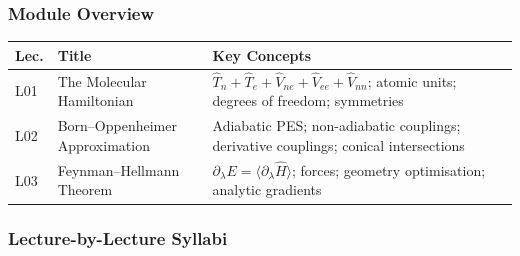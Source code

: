 \documentclass[11pt,a4paper]{article}
\begin{document}
\subsubsection*{Module Overview}
{\footnotesize
\begin{center}
\begin{tabular}{@{}lp{4.2cm}p{6.8cm}@{}}
\toprule
\textbf{Lec.} & \textbf{Title} & \textbf{Key Concepts}\\
\midrule
L01 & The Molecular Hamiltonian & $\hat{T}_n+\hat{T}_e+\hat{V}_{ne}+\hat{V}_{ee}+\hat{V}_{nn}$; atomic units; degrees of freedom; symmetries\\
L02 & Born--Oppenheimer Approximation & Adiabatic PES; non-adiabatic couplings; derivative couplings; conical intersections\\
L03 & Feynman--Hellmann Theorem & $\partial_\lambda E=\langle\partial_\lambda\hat{H}\rangle$; forces; geometry optimisation; analytic gradients\\
\bottomrule
\end{tabular}
\end{center}
}

\subsubsection*{Lecture-by-Lecture Syllabi}
\end{document}

